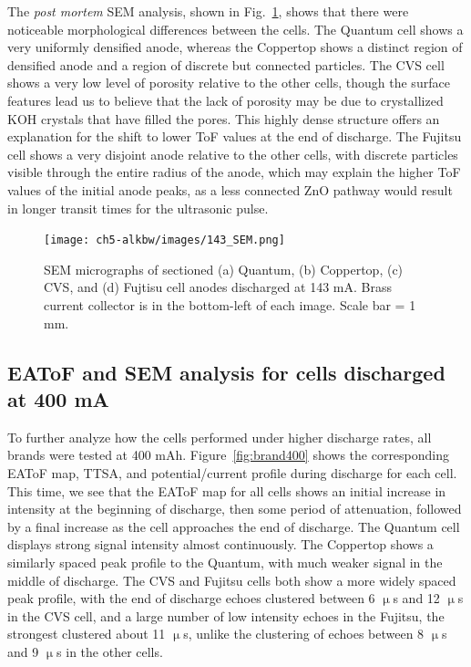The \textit{post mortem} SEM analysis, shown in Fig.~\ref{fig:143sem}, shows that there were noticeable morphological differences between the cells. The Quantum cell shows a very uniformly densified anode, whereas the Coppertop shows a distinct region of densified anode and a region of discrete but connected particles. The CVS cell shows a very low level of porosity relative to the other cells, though the surface features lead us to believe that the lack of porosity may be due to crystallized KOH crystals that have filled the pores. This highly dense structure offers an explanation for the shift to lower ToF values at the end of discharge. The Fujitsu cell shows a very disjoint anode relative to the other cells, with discrete particles visible through the entire radius of the anode, which may explain the higher ToF values of the initial anode peaks, as a less connected ZnO pathway would result in longer transit times for the ultrasonic pulse.


\begin{figure}[htb]
  \centering
    \texttt{[image: ch5-alkbw/images/143\_SEM.png]}
    \caption[SEM micrographs of multiple brands of alkaline AA anodes after discharge at 143 mA.]{SEM micrographs of sectioned (a) Quantum, (b) Coppertop, (c) CVS, and (d) Fujtisu cell anodes discharged at 143 mA. Brass current collector is in the bottom-left of each image. Scale bar = 1 mm.}
    \label{fig:143sem}
\end{figure}

\clearpage

\subsection{EAToF and SEM analysis for cells discharged at 400 mA}

To further analyze how the cells performed under higher discharge rates, all brands were tested at 400 mAh. Figure~\ref{fig:brand400} shows the corresponding EAToF map, TTSA, and potential/current profile during discharge for each cell. This time, we see that the EAToF map for all cells shows an initial increase in intensity at the beginning of discharge, then some period of attenuation, followed by a final increase as the cell approaches the end of discharge. The Quantum cell displays strong signal intensity almost continuously. The Coppertop shows a similarly spaced peak profile to the Quantum, with much weaker signal in the middle of discharge. The CVS and Fujitsu cells both show a more widely spaced peak profile, with the end of discharge echoes clustered between 6 $\upmu$s and 12 $\upmu$s in the CVS cell, and a large number of low intensity echoes in the Fujitsu, the strongest clustered about 11 $\upmu$s, unlike the clustering of echoes between 8 $\upmu$s and 9 $\upmu$s in the other cells. 

